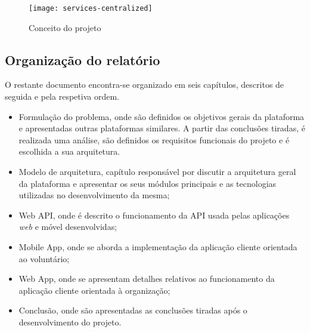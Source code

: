 \bigskip \bigskip \bigskip

\begin{figure}[h]
	\centering
	\texttt{[image: services-centralized]}
	\caption{Conceito do projeto}
\end{figure}

\subsection{Organização do relatório}

O restante documento encontra-se organizado em seis capítulos, descritos de seguida e pela respetiva ordem.
\begin{itemize}
	\item Formulação do problema, onde são definidos os objetivos gerais da plataforma e apresentadas outras plataformas similares. A partir das conclusões tiradas, é realizada uma análise, são definidos os requisitos funcionais do projeto e é escolhida a sua arquitetura.
	\item Modelo de arquitetura, capítulo responsável por discutir a arquitetura geral da plataforma e apresentar os seus módulos principais e as tecnologias utilizadas no desenvolvimento da mesma;
	\item Web API, onde é descrito o funcionamento da API usada pelas aplicações \textit{web} e móvel desenvolvidas;
	\item Mobile App, onde se aborda a implementação da aplicação cliente orientada ao voluntário;
	\item Web App, onde se apresentam detalhes relativos ao funcionamento da aplicação cliente orientada à organização;
	\item Conclusão, onde são apresentadas as conclusões tiradas após o desenvolvimento do projeto.
\end{itemize}
























